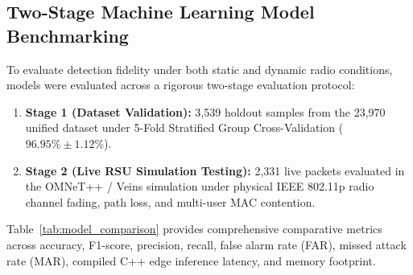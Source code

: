 \documentclass[conference]{IEEEtran}
\begin{document}
\subsection{Two-Stage Machine Learning Model Benchmarking}

To evaluate detection fidelity under both static and dynamic radio conditions, models were evaluated across a rigorous two-stage evaluation protocol:
\begin{enumerate}
    \item \textbf{Stage 1 (Dataset Validation):} 3,539 holdout samples from the 23,970 unified dataset under 5-Fold Stratified Group Cross-Validation ($96.95\% \pm 1.12\%$).
    \item \textbf{Stage 2 (Live RSU Simulation Testing):} 2,331 live packets evaluated in the OMNeT++ / Veins simulation under physical IEEE 802.11p radio channel fading, path loss, and multi-user MAC contention.
\end{enumerate}

Table~\ref{tab:model_comparison} provides comprehensive comparative metrics across accuracy, F1-score, precision, recall, false alarm rate (FAR), missed attack rate (MAR), compiled C++ edge inference latency, and memory footprint.
\end{document}
